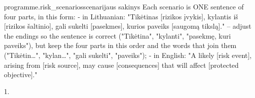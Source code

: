 \par\nopagebreak
\begin{promptexcerpt}{programme.risk_scenarios}{scenarijaus sakinys}
Each scenario is ONE sentence of four parts, in this form:
- in Lithuanian: "Tikėtinas [rizikos įvykis], kylantis iš [rizikos šaltinio], gali sukelti [pasekmes], kurios paveiks [saugomą tikslą]." – adjust the endings so the sentence is correct ("Tikėtina", "kylanti", "pasekmę, kuri paveiks"), but keep the four parts in this order and the words that join them ("Tikėtin…", "kylan…", "gali sukelti", "paveiks");
- in English: "A likely [risk event], arising from [risk source], may cause [consequences] that will affect [protected objective]."
\end{promptexcerpt}

 1.
